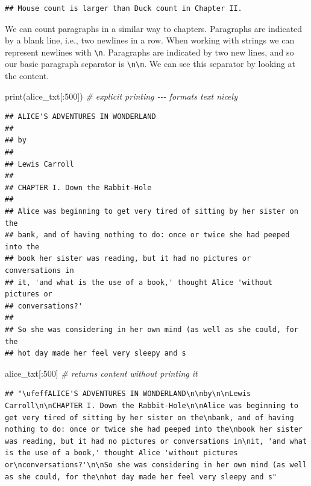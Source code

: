 \documentclass[
]{book}
\newenvironment{Shaded}{\begin{snugshade}}{\end{snugshade}}
\newcommand{\BuiltInTok}[1]{#1}
\newcommand{\CommentTok}[1]{\textcolor[rgb]{0.56,0.35,0.01}{\textit{#1}}}
\newcommand{\DecValTok}[1]{\textcolor[rgb]{0.00,0.00,0.81}{#1}}
\newcommand{\NormalTok}[1]{#1}
\begin{document}
\begin{verbatim}
## Mouse count is larger than Duck count in Chapter II.
\end{verbatim}

We can count paragraphs in a similar way to chapters. Paragraphs are indicated by a blank line, i.e., two newlines in a row. When working with strings we can represent newlines with \texttt{\textbackslash{}n}. Paragraphs are indicated by two new lines, and so our basic paragraph separator is \texttt{\textbackslash{}n\textbackslash{}n}. We can see this separator by looking at the content.

\begin{Shaded}
\begin{Highlighting}[]
\BuiltInTok{print}\NormalTok{(alice\_txt[:}\DecValTok{500}\NormalTok{]) }\CommentTok{\# explicit printing {-}{-}{-} formats text nicely}
\end{Highlighting}
\end{Shaded}

\begin{verbatim}
## ﻿ALICE'S ADVENTURES IN WONDERLAND
## 
## by
## 
## Lewis Carroll
## 
## CHAPTER I. Down the Rabbit-Hole
## 
## Alice was beginning to get very tired of sitting by her sister on the
## bank, and of having nothing to do: once or twice she had peeped into the
## book her sister was reading, but it had no pictures or conversations in
## it, 'and what is the use of a book,' thought Alice 'without pictures or
## conversations?'
## 
## So she was considering in her own mind (as well as she could, for the
## hot day made her feel very sleepy and s
\end{verbatim}

\begin{Shaded}
\begin{Highlighting}[]
\NormalTok{alice\_txt[:}\DecValTok{500}\NormalTok{] }\CommentTok{\# returns content without printing it}
\end{Highlighting}
\end{Shaded}

\begin{verbatim}
## "\ufeffALICE'S ADVENTURES IN WONDERLAND\n\nby\n\nLewis Carroll\n\nCHAPTER I. Down the Rabbit-Hole\n\nAlice was beginning to get very tired of sitting by her sister on the\nbank, and of having nothing to do: once or twice she had peeped into the\nbook her sister was reading, but it had no pictures or conversations in\nit, 'and what is the use of a book,' thought Alice 'without pictures or\nconversations?'\n\nSo she was considering in her own mind (as well as she could, for the\nhot day made her feel very sleepy and s"
\end{verbatim}
\end{document}
